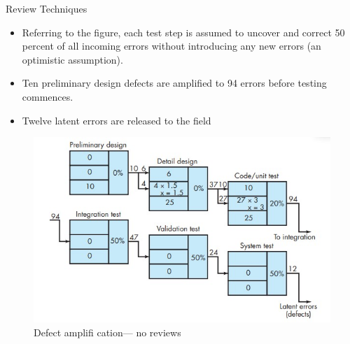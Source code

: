 \documentclass{beamer}
\begin{document}
\begin{frame}{Review Techniques}
	\begin{itemize}
		\item Referring to the figure, each test step is assumed to uncover and correct 50 percent of all   incoming errors without introducing any new errors (an optimistic assumption). 
		\item Ten preliminary design defects are amplified to 94 errors before testing commences. 
		\item Twelve latent errors are released to the field
		
	\end{itemize}
	\begin{figure}
		\includegraphics[scale=.5]{img/m3_17}
		\caption{Defect 
			amplifi cation—
			no reviews}
	\end{figure}
\end{frame}
\end{document}
